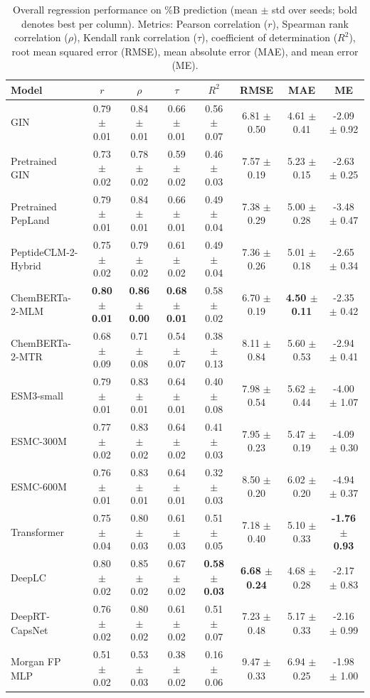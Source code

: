\begin{table}[htbp]
  \caption{Overall regression performance on \%B prediction (mean $\pm$ std over seeds; bold denotes best per column). Metrics: Pearson correlation ($r$), Spearman rank correlation ($\rho$), Kendall rank correlation ($\tau$), coefficient of determination ($R^2$), root mean squared error (RMSE), mean absolute error (MAE), and mean error (ME).}
  \label{tab:overall_performance}
  \centering
  \scriptsize
  \setlength{\tabcolsep}{6pt}
  \begin{tabular}{lccccccc}
    \toprule
    \textbf{Model} & \textbf{$r$} & \textbf{$\rho$} & \textbf{$\tau$} & \textbf{$R^2$} & \textbf{RMSE} & \textbf{MAE} & \textbf{ME} \\
    \midrule
    GIN & 0.79 $\pm$ 0.01 & 0.84 $\pm$ 0.01 & 0.66 $\pm$ 0.01 & 0.56 $\pm$ 0.07 & 6.81 $\pm$ 0.50 & 4.61 $\pm$ 0.41 & -2.09 $\pm$ 0.92 \\
    Pretrained GIN & 0.73 $\pm$ 0.02 & 0.78 $\pm$ 0.02 & 0.59 $\pm$ 0.02 & 0.46 $\pm$ 0.03 & 7.57 $\pm$ 0.19 & 5.23 $\pm$ 0.15 & -2.63 $\pm$ 0.25 \\
    Pretrained PepLand & 0.79 $\pm$ 0.01 & 0.84 $\pm$ 0.01 & 0.66 $\pm$ 0.01 & 0.49 $\pm$ 0.04 & 7.38 $\pm$ 0.29 & 5.00 $\pm$ 0.28 & -3.48 $\pm$ 0.47 \\
    PeptideCLM-2-Hybrid & 0.75 $\pm$ 0.02 & 0.79 $\pm$ 0.02 & 0.61 $\pm$ 0.02 & 0.49 $\pm$ 0.04 & 7.36 $\pm$ 0.26 & 5.01 $\pm$ 0.18 & -2.65 $\pm$ 0.34 \\
    ChemBERTa-2-MLM & \textbf{0.80 $\pm$ 0.01} & \textbf{0.86 $\pm$ 0.00} & \textbf{0.68 $\pm$ 0.01} & 0.58 $\pm$ 0.02 & 6.70 $\pm$ 0.19 & \textbf{4.50 $\pm$ 0.11} & -2.35 $\pm$ 0.42 \\
    ChemBERTa-2-MTR & 0.68 $\pm$ 0.09 & 0.71 $\pm$ 0.08 & 0.54 $\pm$ 0.07 & 0.38 $\pm$ 0.13 & 8.11 $\pm$ 0.84 & 5.60 $\pm$ 0.53 & -2.94 $\pm$ 0.41 \\
    ESM3-small & 0.79 $\pm$ 0.01 & 0.83 $\pm$ 0.01 & 0.64 $\pm$ 0.01 & 0.40 $\pm$ 0.08 & 7.98 $\pm$ 0.54 & 5.62 $\pm$ 0.44 & -4.00 $\pm$ 1.07 \\
    ESMC-300M & 0.77 $\pm$ 0.02 & 0.83 $\pm$ 0.02 & 0.64 $\pm$ 0.02 & 0.41 $\pm$ 0.03 & 7.95 $\pm$ 0.23 & 5.47 $\pm$ 0.19 & -4.09 $\pm$ 0.30 \\
    ESMC-600M & 0.76 $\pm$ 0.01 & 0.83 $\pm$ 0.01 & 0.64 $\pm$ 0.01 & 0.32 $\pm$ 0.03 & 8.50 $\pm$ 0.20 & 6.02 $\pm$ 0.20 & -4.94 $\pm$ 0.37 \\
    Transformer & 0.75 $\pm$ 0.04 & 0.80 $\pm$ 0.03 & 0.61 $\pm$ 0.03 & 0.51 $\pm$ 0.05 & 7.18 $\pm$ 0.40 & 5.10 $\pm$ 0.33 & \textbf{-1.76 $\pm$ 0.93} \\
    DeepLC & 0.80 $\pm$ 0.02 & 0.85 $\pm$ 0.02 & 0.67 $\pm$ 0.02 & \textbf{0.58 $\pm$ 0.03} & \textbf{6.68 $\pm$ 0.24} & 4.68 $\pm$ 0.28 & -2.17 $\pm$ 0.83 \\
    DeepRT-CapsNet & 0.76 $\pm$ 0.02 & 0.80 $\pm$ 0.02 & 0.61 $\pm$ 0.02 & 0.51 $\pm$ 0.07 & 7.23 $\pm$ 0.48 & 5.17 $\pm$ 0.33 & -2.16 $\pm$ 0.99 \\
    Morgan FP MLP & 0.51 $\pm$ 0.02 & 0.53 $\pm$ 0.03 & 0.38 $\pm$ 0.02 & 0.16 $\pm$ 0.06 & 9.47 $\pm$ 0.33 & 6.94 $\pm$ 0.25 & -1.98 $\pm$ 1.00 \\
    \bottomrule
  \end{tabular}
\end{table}
